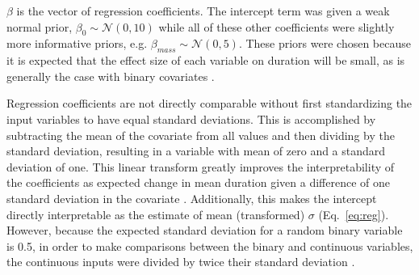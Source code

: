 \documentclass{pnastwo}
\begin{document}
\begin{article}
\begin{materials}
\(\beta\) is the vector of regression coefficients. The intercept term was given a weak normal prior, \(\beta_{0} \sim \mathcal{N}(0, 10)\) while all of these other coefficients were slightly more informative priors, e.g. \(\beta_{mass} \sim \mathcal{N}(0, 5)\). These priors were chosen because it is expected that the effect size of each variable on duration will be small, as is generally the case with binary covariates \cite{Gelman2007}. %

Regression coefficients are not directly comparable without first standardizing the input variables to have equal standard deviations. This is accomplished by subtracting the mean of the covariate from all values and then dividing by the standard deviation, resulting in a variable with mean of zero and a standard deviation of one. This linear transform greatly improves the interpretability of the coefficients as expected change in mean duration given a difference of one standard deviation in the covariate \cite{Schielzeth2010}. Additionally, this makes the intercept directly interpretable as the estimate of mean (transformed) \(\sigma\) (Eq.~\ref{eq:reg}). However, because the expected standard deviation for a random binary variable is 0.5, in order to make comparisons between the binary and continuous variables, the continuous inputs were divided by twice their standard deviation \cite{Gelman2008}. 



\end{materials}
\end{article}
\end{document}
